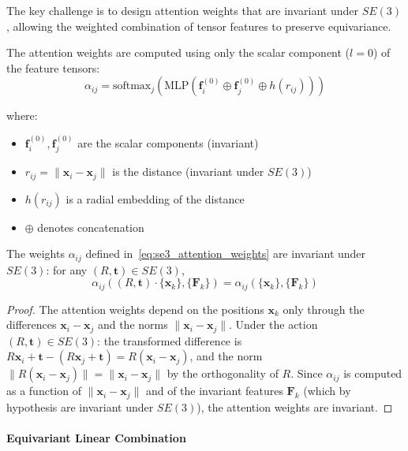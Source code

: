 The key challenge is to design attention weights that are invariant under $SE(3)$, allowing the weighted combination of tensor features to preserve equivariance.

The attention weights are computed using only the scalar component ($l=0$) of the feature tensors:
\begin{equation}\label{eq:se3_attention_weights}
\alpha_{ij} = \text{softmax}_j\left(\text{MLP}\left(\mathbf{f}_i^{(0)} \oplus \mathbf{f}_j^{(0)} \oplus h(r_{ij})\right)\right)
\end{equation}

where:
\begin{itemize}
    \item $\mathbf{f}_i^{(0)}, \mathbf{f}_j^{(0)}$ are the scalar components (invariant)
    \item $r_{ij} = \|\mathbf{x}_i - \mathbf{x}_j\|$ is the distance (invariant under $SE(3)$)
    \item $h(r_{ij})$ is a radial embedding of the distance
    \item $\oplus$ denotes concatenation
\end{itemize}

\begin{proposition}
The weights $\alpha_{ij}$ defined in~\eqref{eq:se3_attention_weights} are invariant under $SE(3)$: for any $(R, \mathbf{t}) \in SE(3)$,
\begin{equation}
\alpha_{ij}((R, \mathbf{t}) \cdot \{\mathbf{x}_k\}, \{\mathbf{F}_k\}) = \alpha_{ij}(\{\mathbf{x}_k\}, \{\mathbf{F}_k\})
\end{equation}
\end{proposition}

\begin{proof}
The attention weights depend on the positions $\mathbf{x}_k$ only through the differences $\mathbf{x}_i - \mathbf{x}_j$ and the norms $\|\mathbf{x}_i - \mathbf{x}_j\|$. Under the action $(R, \mathbf{t}) \in SE(3)$: the transformed difference is $R\mathbf{x}_i + \mathbf{t} - (R\mathbf{x}_j + \mathbf{t}) = R(\mathbf{x}_i - \mathbf{x}_j)$, and the norm $\|R(\mathbf{x}_i - \mathbf{x}_j)\| = \|\mathbf{x}_i - \mathbf{x}_j\|$ by the orthogonality of $R$. Since $\alpha_{ij}$ is computed as a function of $\|\mathbf{x}_i - \mathbf{x}_j\|$ and of the invariant features $\mathbf{F}_k$ (which by hypothesis are invariant under $SE(3)$), the attention weights are invariant.
\end{proof}

\paragraph{Equivariant Linear Combination}

